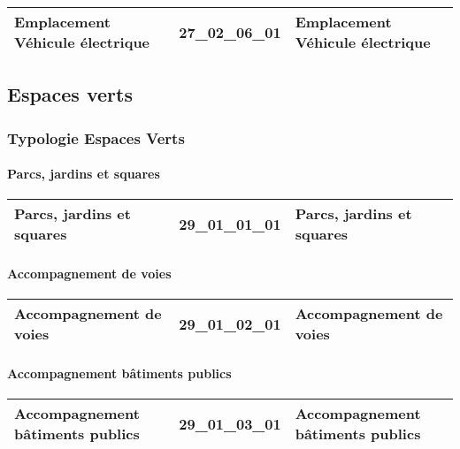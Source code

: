 \documentclass[12pt,titlepage]{book}
\begin{document}
\renewcommand{\arraystretch}{1.2}
\begin{supertabular}{|p{10cm}|c|p{15cm}|}
 Emplacement Véhicule électrique & 27\_02\_06\_01 & Emplacement Véhicule électrique\\
\hline
\end{supertabular}
\subsection{Espaces verts}
\subsubsection{\large Typologie Espaces Verts}
\paragraph{Parcs, jardins et squares}
\noindent
\vspace{\baselineskip}

\renewcommand{\arraystretch}{1.2}
\begin{supertabular}{|p{10cm}|c|p{15cm}|}
 Parcs, jardins et squares & 29\_01\_01\_01 & Parcs, jardins et squares\\
\hline
\end{supertabular}


\paragraph{Accompagnement de voies}
\noindent
\vspace{\baselineskip}

\renewcommand{\arraystretch}{1.2}
\begin{supertabular}{|p{10cm}|c|p{15cm}|}
 Accompagnement de voies & 29\_01\_02\_01 & Accompagnement de voies\\
\hline
\end{supertabular}


\paragraph{Accompagnement bâtiments publics}
\noindent
\vspace{\baselineskip}

\renewcommand{\arraystretch}{1.2}
\begin{supertabular}{|p{10cm}|c|p{15cm}|}
 Accompagnement bâtiments publics & 29\_01\_03\_01 & Accompagnement bâtiments publics\\
\hline
\end{supertabular}
\end{document}
